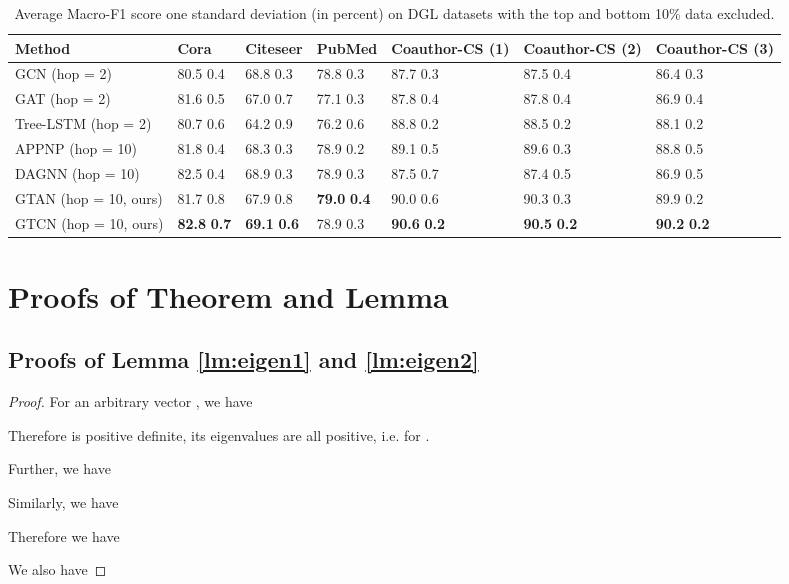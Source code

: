 \documentclass[lettersize,journal]{IEEEtran}
\theoremstyle{plain}
\theoremstyle{definition}
\theoremstyle{remark}
\begin{document}
\appendices
\begin{table*}[t]
	\caption{Average Macro-F1 score  one standard deviation (in percent) on DGL datasets with the top and bottom 10\% data excluded.}
	\label{tb:F1}
	\begin{center}
		\begin{tabularx}{0.9\textwidth}{p{3.5cm} p{1.5cm} p{1.5cm} p{1.5cm} p{1.5cm} p{1.5cm} p{1.5cm}}
			\toprule
			\textbf{Method}  &\textbf{Cora} &\textbf{Citeseer}
			&\textbf{PubMed} &\textbf{Coauthor-CS (1)}
			&\textbf{Coauthor-CS (2)}
			&\textbf{Coauthor-CS (3)} \\
			\midrule
			GCN (hop = 2)  &80.5  0.4 &68.8  0.3 &78.8  0.3 
			&87.7  0.3 &87.5  0.4 &86.4  0.3\\
			GAT (hop = 2) &81.6  0.5 &67.0  0.7 &77.1  0.3 &87.8  0.4 &87.8  0.4 &86.9  0.4\\
			Tree-LSTM (hop = 2) &80.7  0.6 &64.2  0.9 &76.2  0.6 &88.8  0.2 &88.5  0.2 &88.1  0.2\\
			APPNP (hop = 10) &81.8  0.4 &68.3  0.3 &78.9  0.2 &89.1  0.5 &89.6  0.3 &88.8  0.5\\
			DAGNN (hop = 10) &82.5  0.4 &68.9  0.3 &78.9  0.3 &87.5  0.7 &87.4  0.5 &86.9  0.5\\
\midrule
			GTAN (hop = 10, ours) &81.7  0.8 &67.9  0.8 &\textbf{79.0}  \textbf{0.4} &90.0  0.6 &90.3  0.3 &89.9  0.2\\
			GTCN (hop = 10, ours) &\textbf{82.8}  \textbf{0.7} &\textbf{69.1}  \textbf{0.6} &78.9  0.3 &\textbf{90.6}  \textbf{0.2} &\textbf{90.5}  \textbf{0.2} &\textbf{90.2}  \textbf{0.2}\\
			\bottomrule
		\end{tabularx}
	\end{center}
\end{table*}
\section{Proofs of Theorem and Lemma}
\label{proof}
\subsection{Proofs of Lemma \ref{lm:eigen1} and \ref{lm:eigen2}}
\begin{proof}
	For an arbitrary vector , we have
	
	
	
	Therefore  is positive definite, its eigenvalues are all positive, i.e.  for .
	
	Further, we have
	
	
	Similarly, we have
	
	

Therefore we have 


We also have

\end{proof}
\end{document}
